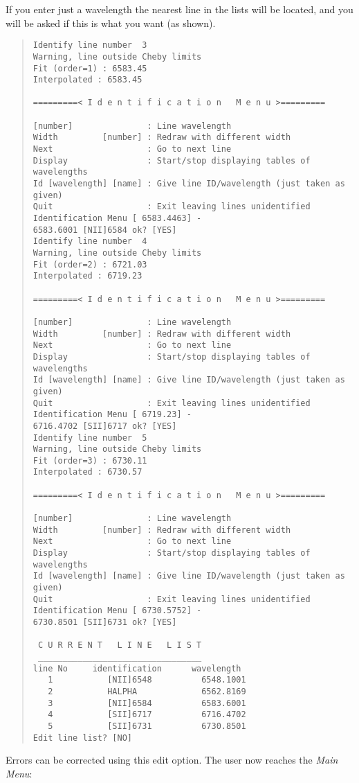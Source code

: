 If you enter just a wavelength the nearest line in the lists will be
located, and you will be asked if this is what you want (as shown).

\begin{quote}\begin{verbatim}
Identify line number  3
Warning, line outside Cheby limits
Fit (order=1) : 6583.45
Interpolated : 6583.45

=========< I d e n t i f i c a t i o n   M e n u >=========

[number]               : Line wavelength
Width         [number] : Redraw with different width
Next                   : Go to next line
Display                : Start/stop displaying tables of wavelengths
Id [wavelength] [name] : Give line ID/wavelength (just taken as given)
Quit                   : Exit leaving lines unidentified
Identification Menu [ 6583.4463] -
6583.6001 [NII]6584 ok? [YES]
Identify line number  4
Warning, line outside Cheby limits
Fit (order=2) : 6721.03
Interpolated : 6719.23

=========< I d e n t i f i c a t i o n   M e n u >=========

[number]               : Line wavelength
Width         [number] : Redraw with different width
Next                   : Go to next line
Display                : Start/stop displaying tables of wavelengths
Id [wavelength] [name] : Give line ID/wavelength (just taken as given)
Quit                   : Exit leaving lines unidentified
Identification Menu [ 6719.23] -
6716.4702 [SII]6717 ok? [YES]
Identify line number  5
Warning, line outside Cheby limits
Fit (order=3) : 6730.11
Interpolated : 6730.57

=========< I d e n t i f i c a t i o n   M e n u >=========

[number]               : Line wavelength
Width         [number] : Redraw with different width
Next                   : Go to next line
Display                : Start/stop displaying tables of wavelengths
Id [wavelength] [name] : Give line ID/wavelength (just taken as given)
Quit                   : Exit leaving lines unidentified
Identification Menu [ 6730.5752] -
6730.8501 [SII]6731 ok? [YES]

 C U R R E N T   L I N E   L I S T
 _________________________________
line No     identification      wavelength
   1           [NII]6548          6548.1001
   2           HALPHA             6562.8169
   3           [NII]6584          6583.6001
   4           [SII]6717          6716.4702
   5           [SII]6731          6730.8501
Edit line list? [NO]
\end{verbatim}\end{quote}
Errors can be corrected using this edit option.
The user now reaches the {\it Main Menu}:

